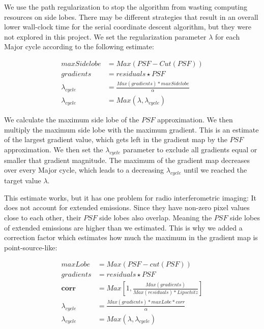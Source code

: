 We use the path regularization to stop the algorithm from wasting computing resources on side lobes. There may be different strategies that result in an overall lower wall-clock time for the serial coordinate descent algorithm, but they were not explored in this project. We set the regularization parameter $\lambda$ for each Major cycle according to the following estimate:

\begin{equation}
\begin{split}
maxSidelobe &= Max(PSF - Cut(PSF)) \\
gradients &= residuals \star PSF \\
\lambda_{cycle} &= \frac{Max(gradients) * maxSidelobe}{\alpha}\\
\lambda_{cycle} &= Max(\lambda, \lambda_{cycle})
\end{split}
\end{equation}

We calculate the maximum side lobe of the $PSF$ approximation. We then multiply the maximum side lobe with the maximum gradient. This is an estimate of the largest gradient value, which gets left in the gradient map by the $PSF$ approximation. We then set the $\lambda_{cycle}$ parameter to exclude all gradients equal or smaller that gradient magnitude. The maximum of the gradient map decreases over every Major cycle, which leads to a decreasing $\lambda_{cycle}$ until we reached the target value $\lambda$.

This estimate works, but it has one problem for radio interferometric imaging: It does not account for extended emissions. Since they have non-zero pixel values close to each other, their $PSF$ side lobes also overlap. Meaning the $PSF$ side lobes of extended emissions are higher than we estimated. This is why we added a correction factor which estimates how much the maximum in the gradient map is point-source-like:

\begin{equation}
\begin{split}
maxLobe &= Max(PSF - cut(PSF)) \\
gradients &= residuals \star PSF \\
\textbf{corr} &= Max \left [1, \frac{Max(gradients)}{Max(residuals) * Lipschitz} \right ] \\
\lambda_{cycle} &= \frac{Max(gradients) * maxLobe * corr}{\alpha}\\
\lambda_{cycle} &= Max(\lambda, \lambda_{cycle})
\end{split}
\end{equation}

